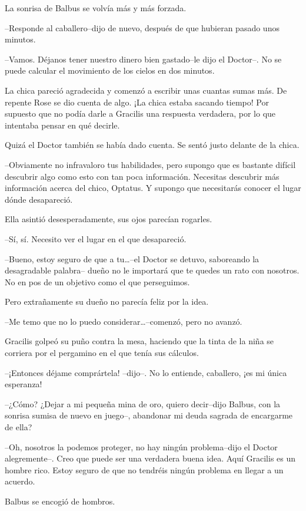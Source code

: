 La sonrisa de Balbus se volvía más y más forzada.

--Responde al caballero--dijo de nuevo, después de que hubieran pasado
unos minutos.

--Vamos. Déjanos tener nuestro dinero bien gastado--le dijo el Doctor--.
No se puede calcular el movimiento de los cielos en dos minutos.

La chica pareció agradecida y comenzó a escribir unas cuantas sumas más.
De repente Rose se dio cuenta de algo. ¡La chica estaba sacando tiempo!
Por supuesto que no podía darle a Gracilis una respuesta verdadera, por
lo que intentaba pensar en qué decirle.

Quizá el Doctor también se había dado cuenta. Se sentó justo delante de
la chica.

--Obviamente no infravaloro tus habilidades, pero supongo que es
bastante difícil descubrir algo como esto con tan poca información.
Necesitas descubrir más información acerca del chico, Optatus. Y supongo
que necesitarás conocer el lugar dónde desapareció.

Ella asintió desesperadamente, sus ojos parecían rogarles.

--Sí, sí. Necesito ver el lugar en el que desapareció.

--Bueno, estoy seguro de que a tu\ldots{}--el Doctor se detuvo,
saboreando la desagradable palabra-- dueño no le importará que te quedes
un rato con nosotros. No en pos de un objetivo como el que perseguimos.

Pero extrañamente su dueño no parecía feliz por la idea.

--Me temo que no lo puedo considerar\ldots{}--comenzó, pero no avanzó.

Gracilis golpeó su puño contra la mesa, haciendo que la tinta de la niña
se corriera por el pergamino en el que tenía sus cálculos.

--¡Entonces déjame comprártela! --dijo--. No lo entiende, caballero, ¡es
mi única esperanza!

--¿Cómo? ¿Dejar a mi pequeña mina de oro, quiero decir--dijo Balbus, con
la sonrisa sumisa de nuevo en juego--, abandonar mi deuda sagrada de
encargarme de ella?

--Oh, nosotros la podemos proteger, no hay ningún problema--dijo el
Doctor alegremente--. Creo que puede ser una verdadera buena idea. Aquí
Gracilis es un hombre rico. Estoy seguro de que no tendréis ningún
problema en llegar a un acuerdo.

Balbus se encogió de hombros.

